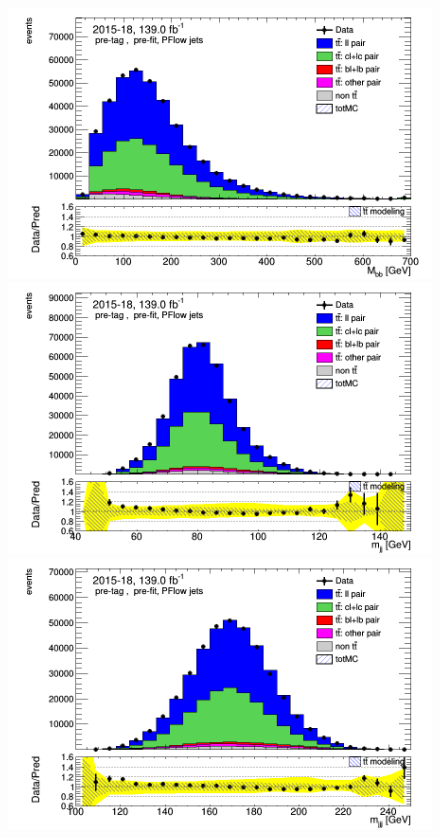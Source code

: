 \documentclass[letterpaper,12pt]{article}
\begin{document}
\begin{figure}
\begin{minipage}[b]{.45\textwidth}
\centering
\includegraphics[width=1\textwidth]{Oct_distributions/pretagNoRwDL1rwithhighpTPFlow_scaledall/DataMC_Mbb.png}
\end{minipage}\hfill
\begin{minipage}[b]{.45\textwidth}
\centering
\includegraphics[width=1\textwidth]{Oct_distributions/pretagNoRwDL1rwithhighpTPFlow_scaledall/DataMC_mjj.png}
\end{minipage}
\begin{minipage}[b]{.45\textwidth}
\centering
\includegraphics[width=1\textwidth]{Oct_distributions/pretagNoRwDL1rwithhighpTPFlow_scaledall/DataMC_mjjj.png}

\end{minipage}
\end{figure}
\end{document}
